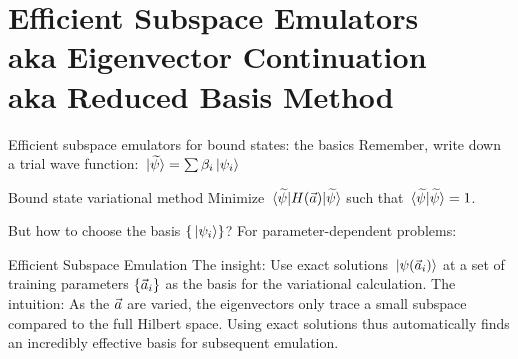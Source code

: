 \documentclass[xcolor=dvipsnames, aspectratio=169]{beamer}
\begin{document}
\section{Efficient Subspace Emulators\\
aka Eigenvector Continuation\\
aka Reduced Basis Method
}


\begin{frame}[t]{Efficient subspace emulators for bound states: the basics}
Remember, write down a \alert{trial wave function}: $\ket*{\widetilde{\psi}} = \sum \beta_i \ket*{\psi_i}$

\begin{myblock}[valign=center]{Bound state variational method}
Minimize $\mel*{\widetilde{\psi}}{H(\vec{a})}{\widetilde{\psi}}$ such that $\braket*{\widetilde{\psi}}{\widetilde{\psi}} = 1$.
\end{myblock}%
\vspace{-0.2cm}%
But how to choose the basis $\{ \ket*{\psi_i} \}$? For parameter-dependent problems:

\begin{myblock}[valign=center]{Efficient Subspace Emulation}
The insight: Use exact solutions $\ket*{\psi(\vec{a}_i)}$ at a set of training parameters $\{\vec{a}_i\}$ as the basis for the variational calculation.
\tcblower
The intuition: As the $\vec{a}$ are varied, the eigenvectors only trace a small subspace compared to the full Hilbert space. Using exact solutions thus automatically finds an \alert{incredibly} effective basis for subsequent emulation.
\end{myblock}

\end{frame}
\end{document}
